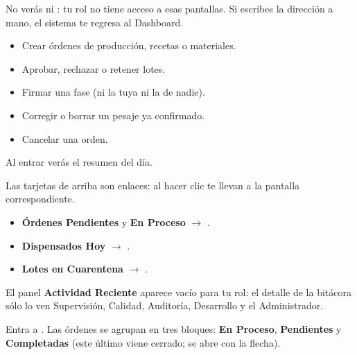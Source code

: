 \vspace{6pt}

No verás  ni : tu rol no tiene acceso a esas pantallas.
Si escribes la dirección a mano, el sistema te regresa al Dashboard.

\begin{itemize}
    \item Crear órdenes de producción, recetas o materiales.
    \item Aprobar, rechazar o retener lotes.
    \item Firmar una fase (ni la tuya ni la de nadie).
    \item Corregir o borrar un pesaje ya confirmado.
    \item Cancelar una orden.
\end{itemize}

\newpage
{}

Al entrar verás el resumen del día.


\vspace{6pt}

Las tarjetas de arriba son enlaces: al hacer clic te llevan a la pantalla correspondiente.

\begin{itemize}
    \item \textbf{Órdenes Pendientes} y \textbf{En Proceso} $\rightarrow$ .
    \item \textbf{Dispensados Hoy} $\rightarrow$ .
    \item \textbf{Lotes en Cuarentena} $\rightarrow$ .
\end{itemize}

El panel \textbf{Actividad Reciente} aparece vacío para tu rol: el detalle de la
bitácora sólo lo ven Supervisión, Calidad, Auditoría, Desarrollo y el Administrador.

\newpage
{}


Entra a . Las órdenes se agrupan en tres bloques:
\textbf{En Proceso}, \textbf{Pendientes} y \textbf{Completadas} (este último viene
cerrado; se abre con la flecha).

